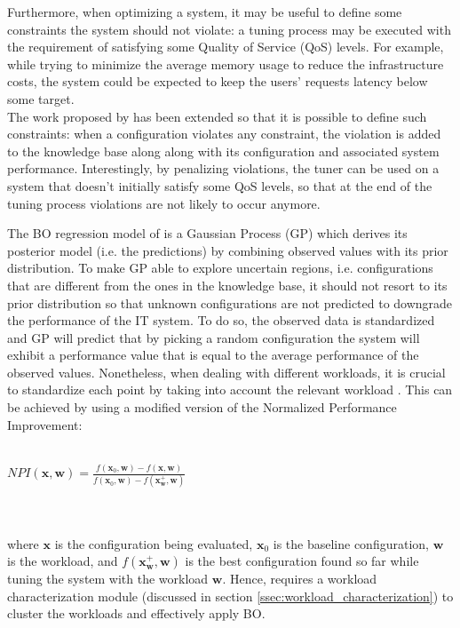 \documentclass[a4paper, 12pt]{article} %
\begin{document}
	Furthermore, when optimizing a system, it may be useful to define some constraints the system should not violate: a tuning process may be executed with the requirement of satisfying some Quality of Service (QoS) levels. For example, while trying to minimize the average memory usage to reduce the infrastructure costs, the system could be expected to keep the users' requests latency below some target.  \\
	The work proposed by \cite{AkamasCGP} has been extended so that it is possible to define such constraints: when a configuration violates any constraint, the violation is added to the knowledge base along along with its configuration and associated system performance. Interestingly, by penalizing violations, the tuner can be used on a system that doesn't initially satisfy some QoS levels, so that at the end of the tuning process violations are not likely to occur anymore.
	
	The BO regression model of \cite{AkamasCGP} is a Gaussian Process (GP) which derives its posterior model (i.e. the predictions) by combining observed values with its prior distribution. To make GP able to explore uncertain regions, i.e. configurations that are different from the ones in the knowledge base, it should not resort to its prior distribution \cite{AkamasCGP} so that unknown configurations are not predicted to downgrade the performance of the IT system. To do so, the observed data is standardized and GP will predict that by picking a random configuration the system will exhibit a performance value that is equal to the average performance of the observed values. Nonetheless, when dealing with different workloads, it is crucial to standardize each point by taking into account the relevant workload \cite{AkamasCGP}. This can be achieved by using a modified version of the Normalized Performance Improvement:\\\\
	\centerline{
	$
	NPI(\pmb{x}, \pmb{w}) = \frac{f(\pmb{x}_0, \pmb{w}) - f(\pmb{x}, \pmb{w})}{f(\pmb{x}_0, \pmb{w}) - f(\pmb{x}^+_{\pmb{w}}, \pmb{w})}
	$
	}\\\\
	where $\pmb{x}$ is the configuration being evaluated, $\pmb{x}_0$ is the baseline configuration, $\pmb{w}$ is the workload, and $f(\pmb{x}^+_{\pmb{w}}, \pmb{w})$ is the best configuration found so far while tuning the system with the workload $\pmb{w}$. Hence, \cite{AkamasCGP} requires a workload characterization module (discussed in section \ref{ssec:workload_characterization}) to cluster the workloads and effectively apply BO.
	
\end{document}
